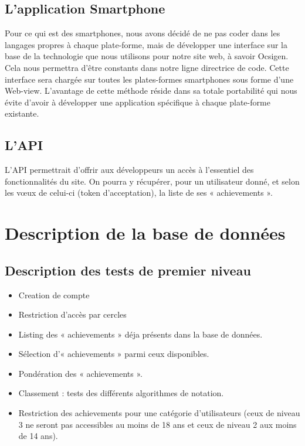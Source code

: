 \documentclass{life-fr}
\begin{document}
\section{L'application Smartphone}
Pour ce qui est des smartphones, nous avons décidé de ne pas coder dans les langages propres à chaque plate-forme, mais de développer une interface sur la base de la technologie que nous utilisons pour notre site web, à savoir Ocsigen. Cela nous permettra d'être constants dans notre ligne directrice de code. Cette interface sera chargée sur toutes les plates-formes smartphones sous forme d'une Web-view. L'avantage de cette méthode réside dans sa totale portabilité qui nous évite d'avoir à développer une application spécifique à chaque plate-forme existante.

\section{L'API}

L'API permettrait d'offrir aux développeurs un accès à l'essentiel des fonctionnalités du site. On pourra y récupérer, pour un utilisateur donné, et selon les vœux de celui-ci (token d'acceptation), la liste de ses « achievements ».


\chapter{Description de la base de données}

\section{Description des tests de premier niveau}

\begin{itemize}
  \item{Creation de compte}
  \item {Restriction d’accès par cercles}
  \item Listing des « achievements » déja présents dans la base de données.
  \item Sélection d’« achievements » parmi ceux disponibles.
  \item Pondération des « achievements ».
  \item Classement : tests des différents algorithmes de notation.
  \item Restriction des achievements pour une catégorie d’utilisateurs (ceux de niveau 3 ne seront pas accessibles au moins de 18 ans et ceux de niveau 2 aux moins de 14 ans).
\end{itemize}
\end{document}
